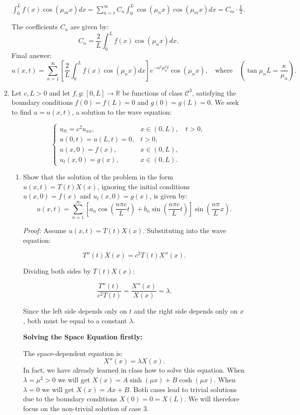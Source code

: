 \documentclass[letterpaper,12pt]{article}
\begin{document}
\begin{enumerate}[Q(1)]
$\int_0^L f(x)\cos(\mu_m x)dx=\sum_{n=1}^\infty C_n\int_0^L \cos(\mu_nx)\cos(\mu_mx)dx=C_m\cdot\frac{L}{2}$.

The coefficients \( C_n \) are given by:
\[
C_n = \frac{2}{L} \int_0^L f(x) \cos(\mu_n x) dx.
\]
Final answer: \[
u(x,t) = \sum_{n=1}^{\infty} [\frac{2}{L}\int_0^L f(x) \cos(\mu_n x) dx] e^{-\alpha^2 \mu_n^2 t} \cos(\mu_n x), \quad \text{where} \quad (\tan\mu_nL=\frac{\kappa}{\mu_n}).
\]







\item Let \( c, L > 0 \) and let \( f, g : [0,L] \to \mathbb{R} \) be functions of class \( \mathcal{C}^3 \), satisfying the boundary conditions \( f(0) = f(L) = 0 \) and \( g(0) = g(L) = 0 \). We seek to find \( u = u(x,t) \), a solution to the wave equation:

\[
\begin{cases}
    u_{tt} = c^2 u_{xx}, & x \in (0,L), \quad t > 0, \\
    u(0,t) = u(L,t) = 0, & t > 0, \\
    u(x,0) = f(x), & x \in (0,L), \\
    u_t(x,0) = g(x), & x \in (0,L).
\end{cases}
\]

\begin{enumerate}
    \item Show that the solution of the problem in the form \( u(x,t) = T(t)X(x) \), ignoring the initial conditions \( u(x,0) = f(x) \) and \( u_t(x,0) = g(x) \), is given by:
    \[
        u(x,t) = \sum_{n=1}^{\infty} \left[ a_n \cos \left( \frac{n\pi c}{L} t \right) + b_n \sin \left( \frac{n\pi c}{L} t \right) \right] \sin \left( \frac{n\pi}{L} x \right).
    \]

\textit{Proof:} Assume $u(x,t) = T(t)X(x).$
Substituting into the wave equation:

\[
T''(t) X(x) = c^2 T(t) X''(x).
\]

Dividing both sides by \( T(t)X(x) \):

\[
\frac{T''(t)}{c^2 T(t)} = \frac{X''(x)}{X(x)} = \lambda.
\]

Since the left side depends only on \( t \) and the right side depends only on \( x \), both must be equal to a constant \( \lambda \).

\textbf{Solving the Space Equation firstly:}

The space-dependent equation is:
\[
X''(x) = \lambda X(x).
\]
In fact, we have already learned in class how to solve this equation. When $\lambda=\mu^2>0$ we will get $X(x)=A\sinh(\mu x)+B \cosh(\mu x)$. When $\lambda =0$ we will get $X(x)=Ax+B$. Both cases lead to trivial solutions due to the boundary conditions $X(0)=0=X(L)$. We will therefore focus on the non-trivial solution of case 3.


\end{enumerate}
\end{enumerate}
\end{document}
